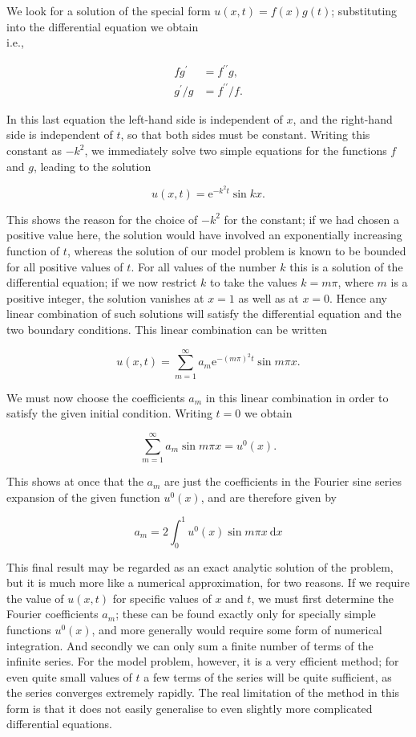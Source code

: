 \documentclass[10pt]{article}
\begin{document}
We look for a solution of the special form \(u(x, t)=f(x) g(t)\); substituting into the differential equation we obtain\\
i.e.,

\[
\begin{aligned}
f g^{\prime} & =f^{\prime \prime} g, \\
g^{\prime} / g & =f^{\prime \prime} / f .
\end{aligned}
\]

In this last equation the left-hand side is independent of \(x\), and the right-hand side is independent of \(t\), so that both sides must be constant. Writing this constant as \(-k^{2}\), we immediately solve two simple equations for the functions \(f\) and \(g\), leading to the solution

\[
u(x, t)=\mathrm{e}^{-k^{2} t} \sin k x .
\]

This shows the reason for the choice of \(-k^{2}\) for the constant; if we had chosen a positive value here, the solution would have involved an exponentially increasing function of \(t\), whereas the solution of our model problem is known to be bounded for all positive values of \(t\). For all values of the number \(k\) this is a solution of the differential equation; if we now restrict \(k\) to take the values \(k=m \pi\), where \(m\) is a positive integer, the solution vanishes at \(x=1\) as well as at \(x=0\). Hence any linear combination of such solutions will satisfy the differential equation and the two boundary conditions. This linear combination can be written

\[
u(x, t)=\sum_{m=1}^{\infty} a_{m} \mathrm{e}^{-(m \pi)^{2} t} \sin m \pi x .
\]

We must now choose the coefficients \(a_{m}\) in this linear combination in order to satisfy the given initial condition. Writing \(t=0\) we obtain

\[
\sum_{m=1}^{\infty} a_{m} \sin m \pi x=u^{0}(x) .
\]

This shows at once that the \(a_{m}\) are just the coefficients in the Fourier sine series expansion of the given function \(u^{0}(x)\), and are therefore given by

\[
a_{m}=2 \int_{0}^{1} u^{0}(x) \sin m \pi x \mathrm{~d} x
\]

This final result may be regarded as an exact analytic solution of the problem, but it is much more like a numerical approximation, for two reasons. If we require the value of \(u(x, t)\) for specific values of \(x\) and \(t\), we must first determine the Fourier coefficients \(a_{m}\); these can be found exactly only for specially simple functions \(u^{0}(x)\), and more generally would require some form of numerical integration. And secondly we can only sum a finite number of terms of the infinite series. For the model problem, however, it is a very efficient method; for even quite small values of \(t\) a few terms of the series will be quite sufficient, as the series converges extremely rapidly. The real limitation of the method in this form is that it does not easily generalise to even slightly more complicated differential equations.
\end{document}
